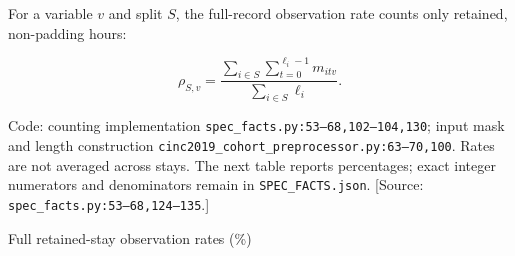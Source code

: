For a variable \(v\) and split \(S\), the full-record observation rate counts only retained, non-padding hours:

\[
\rho_{S,v}=\frac{\sum_{i\in S}\sum_{t=0}^{\ell_i-1}m_{itv}}{\sum_{i\in S}\ell_i}.
\]


Code: counting implementation \texttt{spec\_\allowbreak{}facts.\allowbreak{}py:\allowbreak{}53–\allowbreak{}68,\allowbreak{}102–\allowbreak{}104,\allowbreak{}130}; input mask and length construction \texttt{cinc2019\_\allowbreak{}cohort\_\allowbreak{}preprocessor.\allowbreak{}py:\allowbreak{}63–\allowbreak{}70,\allowbreak{}100}. Rates are not averaged across stays. The next table reports percentages; exact integer numerators and denominators remain in \texttt{SPEC\_\allowbreak{}FACTS.\allowbreak{}json}. [Source: \texttt{spec\_\allowbreak{}facts.\allowbreak{}py:\allowbreak{}53–\allowbreak{}68,\allowbreak{}124–\allowbreak{}135}.]

Full retained-stay observation rates (\%)

